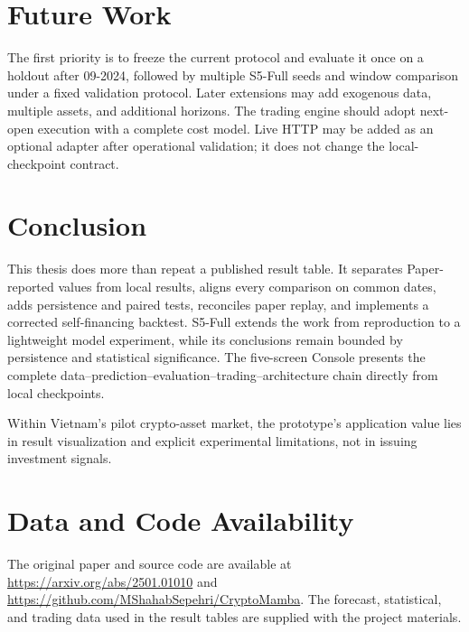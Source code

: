 \documentclass[13pt,a4paper,oneside]{report}
\begin{document}
\section{Future Work}\label{sec:future}
The first priority is to freeze the current protocol and evaluate it once on a holdout after
09-2024, followed by multiple S5-Full seeds and window comparison under a fixed validation
protocol. Later extensions may add exogenous data, multiple assets, and additional horizons. The
trading engine should adopt next-open execution with a
complete cost model. Live HTTP may be added as an optional adapter after operational validation; it
does not change the local-checkpoint contract.

\newpage
\section{Conclusion}\label{sec:conclusion}
This thesis does more than repeat a published result table. It separates Paper-reported values from
local results, aligns every comparison on common dates, adds persistence and paired tests,
reconciles paper replay, and implements a corrected self-financing backtest. S5-Full extends the work
from reproduction to a lightweight model experiment, while its conclusions remain bounded by
persistence and statistical significance. The five-screen Console presents the complete
data--prediction--evaluation--trading--architecture chain directly from local checkpoints.

Within Vietnam's pilot crypto-asset market, the prototype's application value lies in result
visualization and explicit experimental limitations, not in issuing investment signals.

\section*{Data and Code Availability}\label{sec:availability}

The original paper and source code are available at \url{https://arxiv.org/abs/2501.01010} and
\url{https://github.com/MShahabSepehri/CryptoMamba}. The forecast, statistical, and trading data used
in the result tables are supplied with the project materials.
\end{document}
